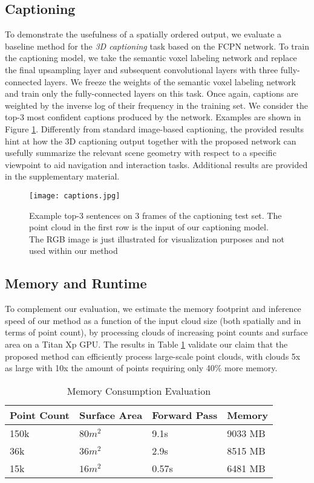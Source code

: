 \documentclass[runningheads]{llncs}
\begin{document}
\subsection{Captioning}
\label{section:EvalCaptioniong}

To demonstrate the usefulness of a spatially ordered output, we evaluate a baseline method for the \textit{3D captioning} task based on the FCPN network. 
To train the captioning model, we take the semantic voxel labeling network and replace the final upsampling layer and subsequent convolutional layers with three fully-connected layers. We freeze the weights of the semantic voxel labeling network and train only the fully-connected layers on this task. Once again, captions are weighted by the inverse log of their frequency in the training set. We consider the top-3 most confident captions produced by the network. Examples are shown in Figure \ref{fig:captiong_result}. Differently from standard image-based captioning, the provided results hint at how the 3D captioning output together with the proposed network can usefully summarize the relevant scene geometry with respect to a specific viewpoint to aid navigation and interaction tasks. Additional results are provided in the supplementary material. 

\begin{figure}[t]
    \centering
 \texttt{[image: captions.jpg]} 
    \caption{Example top-3 sentences on 3 frames of the captioning test set. The point cloud in the first row is the input of our captioning model. The RGB image is just illustrated for visualization purposes and not used within our method}
    \label{fig:captiong_result} 
\end{figure}

\subsection{Memory and Runtime}

To complement our evaluation, we estimate the memory footprint and inference speed of our method as a function of the input cloud size (both spatially and in terms of point count), by processing clouds of increasing point counts and surface area on a Titan Xp GPU. The results in Table \ref{table:runtime} validate our claim that the proposed method can efficiently process large-scale point clouds, with clouds 5x as large with 10x the amount of points requiring only 40\% more memory.

\begin{table}[h]
\setlength{\tabcolsep}{1em}
\centering
\caption{Memory Consumption Evaluation}
\label{table:runtime}{%
{\renewcommand{\arraystretch}{1.1}%
\begin{tabular}{l l l l}
\textbf{Point Count} & \textbf{Surface Area} & \textbf{Forward Pass} & \textbf{Memory} \\
\hline
150k & $80m^2$ & 9.1s & 9033 MB\\
36k & $36m^2$ & 2.9s & 8515 MB\\
15k & $16m^2$ & 0.57s & 6481 MB\\                 
\end{tabular}}}
\end{table}
\end{document}
